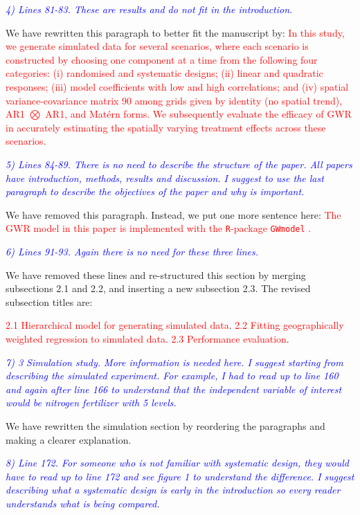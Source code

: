 \documentclass[a4paper]{article}   	%
\newcommand{\R}{\texttt{R}}
\newcommand{\revision}[1]{\textcolor{red}{#1}}
\newcommand{\reviewer}[1]{\textcolor{blue}{\textit{#1}}}
\begin{document}
\reviewer{4) Lines 81-83. These are results and do not fit in the introduction.}

We have rewritten this paragraph to better fit the manuscript by:
\revision{In this study, we generate simulated data for several scenarios, where each scenario is constructed by choosing one component at a time from the following four categories: (i) randomised and systematic designs; (ii) linear and quadratic responses; (iii) model coefficients with low and high correlations; and (iv) spatial variance-covariance matrix
90 among grids given by identity (no spatial trend), AR1 $\bigotimes$ AR1, and Mat\'{e}rn forms. We subsequently evaluate the efficacy of GWR in accurately estimating the spatially varying treatment effects across these scenarios.}


\reviewer{5) Lines 84-89. There is no need to describe the structure of the paper. All papers have introduction, methods, results and discussion. I suggest to use the last paragraph to describe the objectives of the paper and why is important.}

We have removed this paragraph. Instead, we put one more sentence here: 
\revision{The GWR model in this paper is implemented with the \R-package \texttt{GWmodel} \parencite{lu2014gwmodel, Gollini2015GWmodel}.}

\reviewer{6) Lines 91-93. Again there is no need for these three lines.}

We have removed these lines and re-structured this section by merging subsections 2.1 and 2.2, and inserting a new subsection 2.3. The revised subsection titles are: 

\revision{2.1 Hierarchical model for generating simulated data}.
\revision{2.2 Fitting geographically weighted regression to simulated data}.
\revision{2.3 Performance evaluation}.


\reviewer{7) 3 Simulation study. More information is needed here. I suggest starting from describing the simulated experiment. For example, I had to read up to line 160 and again after line 166 to understand that the independent variable of interest would be nitrogen fertilizer with 5 levels.}

We have rewritten the simulation section by reordering the paragraphs and making a clearer explanation. 

\reviewer{8) Line 172. For someone who is not familiar with systematic design, they would have to read up to line 172 and see figure 1 to understand the difference. I suggest describing what a systematic design is early in the introduction so every reader understands what is being compared.}
\end{document}
